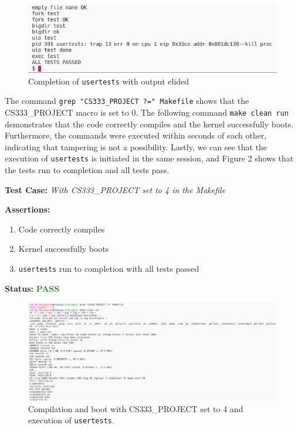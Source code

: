\documentclass[11pt,letterpaper]{report}
\newcommand{\code}[1]{\colorbox{codegray}{\texttt{#1}}}
\begin{document}
{  \begin{figure}[h!]
	\centering
	\includegraphics[width=1\linewidth]{compilation1-usertests2.png}
	\caption[img]{Completion of \code{usertests} with output elided}
	\label{fig:P1compileP0-1}
  \end{figure}

  The command \code{grep "CS333\_PROJECT ?=" Makefile} shows that the CS333\_PROJECT macro is set to 0.
  The following command \code{make clean run} demonstrates that the code correctly compiles and the kernel successfully boots. 
  Furthermore, the commands were executed within seconds of each other, indicating that
  tampering is not a possibility. Lastly, we can see that the execution of \code{usertests}
  is initiated in the same session, and Figure 2 shows that the tests run to completion and 
  all tests pass. \\

  \pagebreak

  \noindent\textbf{Test Case:} \emph{With CS333\_PROJECT set to 4 in the Makefile}
  
  \noindent\textbf{Assertions:}
  \begin{enumerate}[]
  \item Code correctly compiles
  \item Kernel successfully boots
  \item \code{usertests} run to completion with all tests passed
  \end{enumerate}  
  
  \noindent\textbf{Status:} \textcolor{ForestGreen}{\textbf{PASS}}
  
  \begin{figure}[h!]
	\centering
	\includegraphics[width=1\linewidth]{compilation2-usertests1.png}
	\caption[img]{Compilation and boot with CS333\_PROJECT set to 4 and execution of \code{usertests}.}
	\label{fig:P1compileP0-1}
  \end{figure}

}
\end{document}
